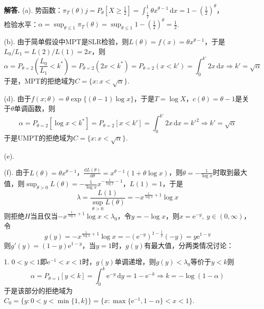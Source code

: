\documentclass[12pt, a4paper, oneside]{ctexart}
\newenvironment{solution}[1][]{\par\noindent\textbf{#1解答. }}{\smallskip\par}  %
\let\leq=\leqslant %
\let\geq=\geqslant %
\def\d{\mathrm{d}}          %
\def\e{\mathrm{e}}          %
\def\add{\vspace{1ex}}      %
\begin{document}
\begin{solution}
    (a). 势函数：$\pi_{T}(\theta)j = P_{\theta}\left[X\geq \frac{1}{2}\right] = \int_{\frac{1}{2}}^1\theta x^{\theta-1}\,\d x=1-\left(\frac{1}{2}\right)^\theta$，\add \\
    检验水平：$\alpha = \sup_{\theta\leq 1}\pi_T(\theta) = \sup_{\theta\leq 1}1-\left(\frac{1}{2}\right)^\theta = \frac{1}{2}$.\add 

    (b). 由于简单假设中MPT是SLR检验，则$L(\theta) = f(x) = \theta x^{\theta-1}$，于是$L_0/L_1 = L(2) / L(1) = 2x$，则
    \begin{equation*}
        \alpha = P_{\theta=2}\left(\frac{L_0}{L_1}<k^*\right)= P_{\theta=2}(2x<k^*) = P_{\theta=2}(x < k') = \int_0^{k'}2x\,\d x\Rightarrow k'=\sqrt{\alpha}
    \end{equation*}
    于是，MPT的拒绝域为$C=\{x:x<\sqrt{\alpha}\}$.\add

    (d). 由于$f(x;\theta) = \theta\exp\{(\theta-1)\log x\}$，于是$T = \log X$，$c(\theta) = \theta-1$是关于$\theta$单调函数，则
    \begin{equation*}
        \alpha  = P_{\theta=2}[\log x < k^*] = P_{\theta=2}[x<k'] = \int_0^{k'}2x\,\d x = k'^2\Rightarrow k' = \sqrt{\alpha}
    \end{equation*}
    于是UMPT的拒绝域为$C = \{x:x < \sqrt{\alpha}\}$.

    (e). 

    (f). 由于$L(\theta) = \theta x^{\theta -1}$，$\frac{\d L(\theta)}{\d \theta} = x^{\theta-1}(1+\theta \log x)$，则$\theta = -\frac{1}{\log x}$时取到最大值，则$\sup_{\theta > 0}L(\theta) = -\frac{1}{\log x}x^{-\frac{1}{\log x}-1}$，$L(1) = 1$，于是
    \begin{equation*}
        \lambda = \frac{L(1)}{\sup_{\theta > 0}L(\theta)} = -x^{\frac{1}{\log x}+1}\log x
    \end{equation*}
    则拒绝$H$当且仅当$-x^{\frac{1}{\log x}+1}\log x < \lambda_0$，令$y=-\log x$，则$x=\e^{-y},\ y\in(0,\infty)$，令
    \begin{equation*}
        g(y) = -x^{\frac{1}{\log x}+1}\log x = -\left(\e^{-y}\right)^{1-\frac{1}{y}}(-y) = y\e^{1-y}
    \end{equation*}
    则$g'(y) = (1-y)\e^{1-y}$，当$y=1$时，$g(y)$有最大值，分两类情况讨论：

    1. $0<y<1$即$\e^{-1}<x<1$时，$g(y)$单调递增，则$g(y) < \lambda_0$等价于$y<k$则
    \begin{equation*}
        \alpha = P_{\theta = 1}[y<k] = \int_0^k\e^{-y}\,\d y = 1-\e^{-k}\Rightarrow k = -\log (1-\alpha)
    \end{equation*}
    于是该部分的拒绝域为$C_0 = \{y: 0<y<\min\{1, k\}\} = \{x:\max\{\e^{-1}, 1-\alpha\} < x < 1\}$.


\end{solution}
\end{document}
